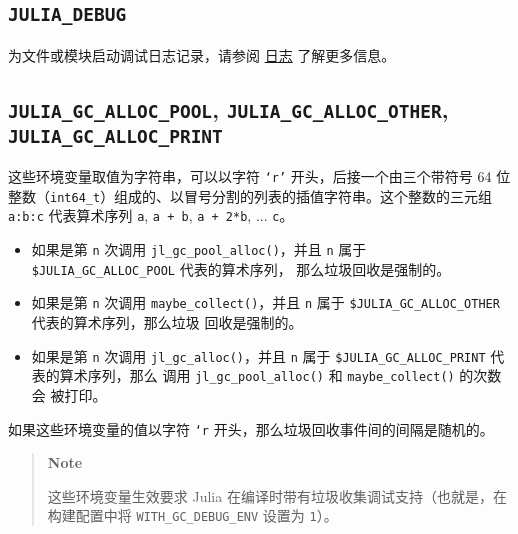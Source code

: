 \subsection{\texttt{JULIA\_DEBUG}}



为文件或模块启动调试日志记录，请参阅 \href{@ref Logging}{日志} 了解更多信息。



\hypertarget{17935900017233878037}{}


\subsection{\texttt{JULIA\_GC\_ALLOC\_POOL}, \texttt{JULIA\_GC\_ALLOC\_OTHER}, \texttt{JULIA\_GC\_ALLOC\_PRINT}}



这些环境变量取值为字符串，可以以字符 \texttt{‘r’} 开头，后接一个由三个带符号 64 位整数（\texttt{int64\_t}）组成的、以冒号分割的列表的插值字符串。这个整数的三元组 \texttt{a:b:c} 代表算术序列 \texttt{a}, \texttt{a + b}, \texttt{a + 2*b}, ... \texttt{c}。



\begin{itemize}
\item 如果是第 \texttt{n} 次调用 \texttt{jl\_gc\_pool\_alloc()}，并且 \texttt{n}   属于 \texttt{\$JULIA\_GC\_ALLOC\_POOL} 代表的算术序列，   那么垃圾回收是强制的。


\item 如果是第 \texttt{n} 次调用 \texttt{maybe\_collect()}，并且 \texttt{n} 属于   \texttt{\$JULIA\_GC\_ALLOC\_OTHER} 代表的算术序列，那么垃圾   回收是强制的。


\item 如果是第 \texttt{n} 次调用 \texttt{jl\_gc\_alloc()}，并且 \texttt{n} 属于   \texttt{\$JULIA\_GC\_ALLOC\_PRINT} 代表的算术序列，那么   调用 \texttt{jl\_gc\_pool\_alloc()} 和 \texttt{maybe\_collect()} 的次数会   被打印。

\end{itemize}


如果这些环境变量的值以字符 \texttt{‘r{\textquotesingle}} 开头，那么垃圾回收事件间的间隔是随机的。



\begin{quote}
\textbf{Note}

这些环境变量生效要求 Julia 在编译时带有垃圾收集调试支持（也就是，在构建配置中将 \texttt{WITH\_GC\_DEBUG\_ENV} 设置为 \texttt{1}）。

\end{quote}


